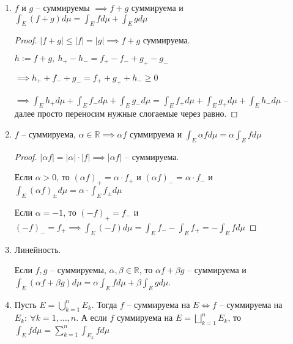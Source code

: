 \begin{properties}
\begin{enumerate}
{            \begin{proof}
                $f_+ - f_- = f \leq g = g_+ - g_- \implies 0 \leq f_+ + g_- \leq f_- + g_+ \implies \int_E{f_+ d \mu} + \int_E{g_- d \mu} \leq \int_E{f_- d \mu} + \int_E{g_+ d \mu}$ -- переносим слагаемые в нужные стороны и чтд.
            \end{proof}
        }
        \item {
            $f$ и $g$ -- суммируемы $\implies f + g$ суммируема и $\int_E{(f+g) d \mu} = \int_E{f d \mu} + \int_E{g d \mu}$

            \begin{proof}
                $|f + g| \leq |f| = |g| \implies f+g$ суммируема.

                $h := f + g, \ h_+ - h_- = f_+ -  f_- + g_+ - g_-$

                $\implies h_+ + f_- + g_- = f_+ + g_+ + h_- \geq 0$

                $\implies \int_E{h_+ d \mu} + \int_E{f_- d \mu} + \int_E{g_- d \mu} = \int_E{f_+ d \mu} + \int_E{g_+ d \mu} + \int_E{h_- d \mu}$ -- далее просто переносим нужные слогаемые через равно.
            \end{proof}
        }
        \item {
            $f$ -- суммируема, $\alpha \in \mathbb{R} \implies \alpha f$ суммируема и $\int_E{\alpha f d \mu} = \alpha \int_E{f d \mu}$

            \begin{proof}
                $|\alpha f| = |\alpha| \cdot |f| \implies |\alpha f|$ -- суммируема.

                Если $\alpha > 0$, то $(\alpha f)_+ = \alpha \cdot f_+$ и $(\alpha f)_- = \alpha \cdot f_-$ и $\int_E{(\alpha f)_{\pm} d \mu} = \alpha \cdot \int_E{f_{\pm} d \mu}$ 

                Если $\alpha = -1$, то $(-f)_+ = f_-$ и $(-f)_- = f_+ \implies \int_E{(-f) d \mu} = \int_E{f_-} - \int_E{f_+} = - \int_E{f d \mu}$
            \end{proof}
        }
        \item {
            Линейность. 

            Если $f, g$ -- суммируемы, $\alpha, \beta \in \mathbb{R}$, то $\alpha f + \beta g$ -- суммируема и $\int_E{(\alpha f + \beta g) d \mu} = \alpha \int_E{f d \mu} + \beta \int_E{g d \mu}$.
        }
        \item {
            Пусть $E = \bigcup_{k=1}^{n} E_k$. Тогда $f$ -- суммируема на $E \Leftrightarrow f$ -- суммируема на $E_k: \ \forall k = 1, \dots, n$. А если $f$ суммируема на $E = \bigsqcup_{k=1}^{n} E_k$, то $\int_E{f d \mu} = \sum_{k=1}^{n} \int_{E_k}{f d \mu}$

}
\end{enumerate}
\end{properties}
